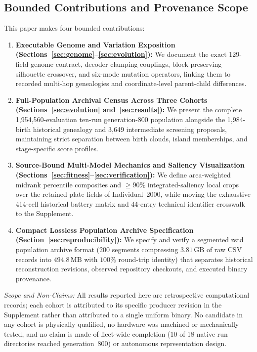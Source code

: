 \subsection{Bounded Contributions and Provenance Scope}
\label{subsec:contributions}
This paper makes four bounded contributions:
\begin{enumerate}[leftmargin=*,nosep]
  \item \textbf{Executable Genome and Variation Exposition (Sections~\ref{sec:genome}--\ref{sec:evolution}):} We document the exact 129-field genome contract, decoder clamping couplings, block-preserving silhouette crossover, and six-mode mutation operators, linking them to recorded multi-hop genealogies and coordinate-level parent-child differences.
  \item \textbf{Full-Population Archival Census Across Three Cohorts (Sections~\ref{sec:evolution} and~\ref{sec:results}):} We present the complete 1,954,560-evaluation ten-run generation-800 population alongside the 1,984-birth historical genealogy and 3,649 intermediate screening proposals, maintaining strict separation between birth clouds, island memberships, and stage-specific score profiles.
  \item \textbf{Source-Bound Multi-Model Mechanics and Saliency Visualization (Sections~\ref{sec:fitness}--\ref{sec:verification}):} We define area-weighted midrank percentile composites and $\ge 90\%$ integrated-saliency local crops over the retained plate fields of Individual~2000, while moving the exhaustive 414-cell historical battery matrix and 44-entry technical identifier crosswalk to the Supplement.
  \item \textbf{Compact Lossless Population Archive Specification (Section~\ref{sec:reproducibility}):} We specify and verify a segmented zstd population archive format ($200$ segments compressing $3.81\,\mathrm{GB}$ of raw CSV records into $494.8\,\mathrm{MB}$ with $100\%$ round-trip identity) that separates historical reconstruction revisions, observed repository checkouts, and executed binary provenance.
\end{enumerate}

\emph{Scope and Non-Claims:} All results reported here are retrospective computational records; each cohort is attributed to its specific producer revision in the Supplement rather than attributed to a single uniform binary. No candidate in any cohort is physically qualified, no hardware was machined or mechanically tested, and no claim is made of fleet-wide completion (10 of 18 native run directories reached generation~800) or autonomous representation design.
